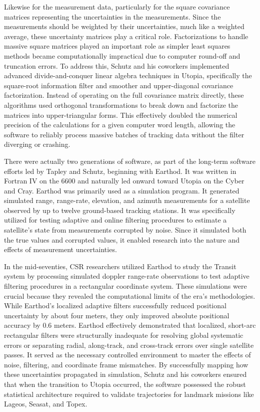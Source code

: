 Likewise for the measurement data, particularly for the square covariance matrices representing the uncertainties in the measurements. Since the measurements should be weighted by their uncertainties, much like a weighted average, these uncertainty matrices play a critical role. Factorizations to handle massive square matrices played an important role as simpler least squares methods became computationally impractical due to computer round-off and truncation errors. To address this, Schutz and his coworkers implemented advanced divide-and-conquer linear algebra techniques in Utopia, specifically the square-root information filter and smoother and upper-diagonal covariance factorization. Instead of operating on the full covariance matrix directly, these algorithms used orthogonal transformations to break down and factorize the matrices into upper-triangular forms. This effectively doubled the numerical precision of the calculations for a given computer word length, allowing the software to reliably process massive batches of tracking data without the filter diverging or crashing.

There were actually two generations of software, as part of the long-term software efforts led by Tapley and Schutz, beginning with Earthod. It was written in Fortran IV on the 6600 and naturally led onward toward Utopia on the Cyber and Cray. Earthod was primarily used as a simulation program. It generated simulated range, range-rate, elevation, and azimuth measurements for a satellite observed by up to twelve ground-based tracking stations. It was specifically utilized for testing adaptive and online filtering procedures to estimate a satellite's state from measurements corrupted by noise. Since it simulated both the true values and corrupted values, it enabled research into the nature and effects of measurement uncertainties. 

In the mid-seventies, CSR researchers utilized Earthod to study the Transit system by processing simulated doppler range-rate observations to test adaptive filtering procedures in a rectangular coordinate system. These simulations were crucial because they revealed the computational limits of the era's methodologies. While Earthod's localized adaptive filters successfully reduced positional uncertainty by about four meters, they only improved absolute positional accuracy by 0.6 meters. Earthod effectively demonstrated that localized, short-arc rectangular filters were structurally inadequate for resolving global systematic errors or separating radial, along-track, and cross-track errors over single satellite passes. It served as the necessary controlled environment to master the effects of noise, filtering, and coordinate frame mismatches. By successfully mapping how these uncertainties propagated in simulation, Schutz and his coworkers ensured that when the transition to Utopia occurred, the software possessed the robust statistical architecture required to validate trajectories for landmark missions like Lageos, Seasat, and Topex.

